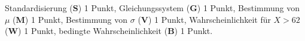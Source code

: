\begin{bewertung}
Standardisierung ({\bf S}) 1 Punkt,
Gleichungssystem ({\bf G}) 1 Punkt,
Bestimmung von $\mu$ ({\bf M}) 1 Punkt,
Bestimmung von $\sigma$ ({\bf V}) 1 Punkt,
Wahrscheinlichkeit für $X>62$ ({\bf W}) 1 Punkt,
bedingte Wahrscheinlichkeit ({\bf B}) 1 Punkt.
\end{bewertung}



